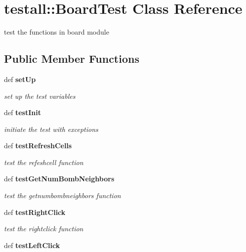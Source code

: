 \section{testall::Board\-Test Class Reference}
\label{classtestall_1_1BoardTest}
test the functions in board module  


\subsection*{Public Member Functions}
\begin{CompactItemize}
\item 
def \bf{set\-Up}\label{classtestall_1_1BoardTest_f5e42d7a7bd2ac5500f98b67f5235a6b}

\begin{CompactList}\small\item\em set up the test variables \item\end{CompactList}\item 
def \bf{test\-Init}\label{classtestall_1_1BoardTest_2af2a03f8212ec36e08e6f51480015dd}

\begin{CompactList}\small\item\em initiate the test with exceptions \item\end{CompactList}\item 
def \bf{test\-Refresh\-Cells}\label{classtestall_1_1BoardTest_44f1d6b2c195a9065bda37f4867bc702}

\begin{CompactList}\small\item\em test the refeshcell function \item\end{CompactList}\item 
def \bf{test\-Get\-Num\-Bomb\-Neighbors}\label{classtestall_1_1BoardTest_8b91b8c08dced5861d45cb36327280a9}

\begin{CompactList}\small\item\em test the getnumbombneighbors function \item\end{CompactList}\item 
def \bf{test\-Right\-Click}\label{classtestall_1_1BoardTest_46d3cae44299dc5f325bcd2aab03cc6c}

\begin{CompactList}\small\item\em test the rightclick function \item\end{CompactList}\item 
def \bf{test\-Left\-Click}\label{classtestall_1_1BoardTest_7e615af192ed1d3b84fa064100b7d333}


\end{CompactItemize}
